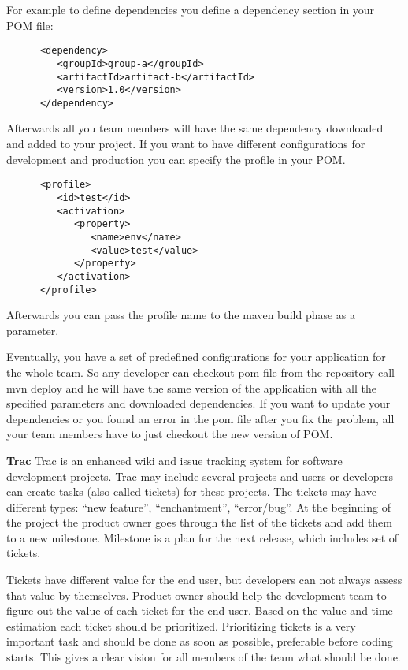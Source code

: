  For example to define dependencies you define a dependency section in your POM file:
  \lstset{language=XML}
    \begin{lstlisting}
      <dependency>
         <groupId>group-a</groupId>
         <artifactId>artifact-b</artifactId>
         <version>1.0</version>
      </dependency>
    \end{lstlisting}  

  Afterwards all you team members will have the same dependency downloaded and
  added to your project. If you want to have different configurations for
  development and production you can specify the profile in your POM.
   \lstset{language=XML}
    \begin{lstlisting}
      <profile>
         <id>test</id>
         <activation>
            <property>
               <name>env</name>
               <value>test</value>
            </property>
         </activation>
      </profile>
    \end{lstlisting}
  Afterwards you can pass the profile name to the maven build phase as
  a parameter.

  Eventually, you have a set of predefined configurations for your application
  for the whole team. So any developer can checkout pom file from the repository
  call mvn deploy and he will have the same version of the application with all
  the specified parameters and downloaded dependencies. If you want to update
  your dependencies or you found an error in the pom file after you fix the
  problem, all your team members have to just checkout the new version of POM.
 
  \textbf{Trac}
  Trac is an enhanced wiki and issue tracking system for software development
  projects. Trac may include several projects and users or developers can
  create tasks (also called tickets) for these projects. The tickets may have different types:
  ``new feature'', ``enchantment'', ``error/bug''. At the beginning of the project the product owner
  goes through the list of the tickets and add them to a new milestone.
  Milestone is a plan for the next release, which includes set of tickets.

  Tickets have different value for the end user, but developers can not always
  assess that value by themselves. Product owner should help the development team to figure out the
  value of each ticket for the end user. Based on the value and time estimation each ticket should be prioritized.
  Prioritizing tickets is a very important task and should be done as soon as
  possible, preferable before coding starts. This gives a clear vision for all
  members of the team what should be done.

